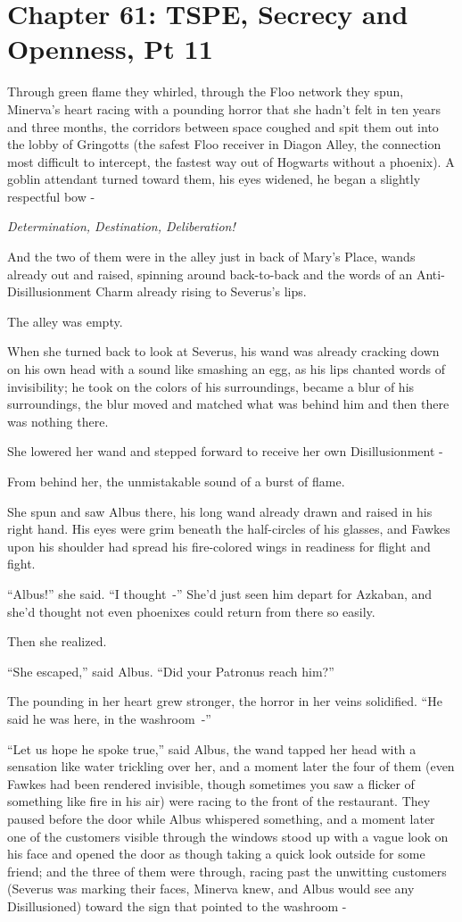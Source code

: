 \chapter{Chapter 61: TSPE, Secrecy and Openness, Pt 11}
Through green flame they whirled, through the Floo network they spun, Minerva's heart racing with a pounding horror that she hadn't felt in ten years and three months, the corridors between space coughed and spit them out into the lobby of Gringotts (the safest Floo receiver in Diagon Alley, the connection most difficult to intercept, the fastest way out of Hogwarts without a phoenix). A goblin attendant turned toward them, his eyes widened, he began a slightly respectful bow -

\emph{Determination, Destination, Deliberation!}

And the two of them were in the alley just in back of Mary's Place, wands already out and raised, spinning around back-to-back and the words of an Anti-Disillusionment Charm already rising to Severus's lips.

The alley was empty.

When she turned back to look at Severus, his wand was already cracking down on his own head with a sound like smashing an egg, as his lips chanted words of invisibility; he took on the colors of his surroundings, became a blur of his surroundings, the blur moved and matched what was behind him and then there was nothing there.

She lowered her wand and stepped forward to receive her own Disillusionment -

From behind her, the unmistakable sound of a burst of flame.

She spun and saw Albus there, his long wand already drawn and raised in his right hand. His eyes were grim beneath the half-circles of his glasses, and Fawkes upon his shoulder had spread his fire-colored wings in readiness for flight and fight.

``Albus!'' she said. ``I thought~-'' She'd just seen him depart for Azkaban, and she'd thought not even phoenixes could return from there so easily.

Then she realized.

``She escaped,'' said Albus. ``Did your Patronus reach him?''

The pounding in her heart grew stronger, the horror in her veins solidified. ``He said he was here, in the washroom~-''

``Let us hope he spoke true,'' said Albus, the wand tapped her head with a sensation like water trickling over her, and a moment later the four of them (even Fawkes had been rendered invisible, though sometimes you saw a flicker of something like fire in his air) were racing to the front of the restaurant. They paused before the door while Albus whispered something, and a moment later one of the customers visible through the windows stood up with a vague look on his face and opened the door as though taking a quick look outside for some friend; and the three of them were through, racing past the unwitting customers (Severus was marking their faces, Minerva knew, and Albus would see any Disillusioned) toward the sign that pointed to the washroom -

